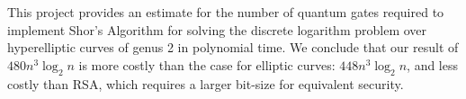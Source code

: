 This project provides an estimate for the number of quantum gates required to implement Shor's Algorithm for solving the discrete logarithm problem over hyperelliptic curves of genus 2 in polynomial time. We conclude that our result of $480n^3\log_2n$ is more costly than the case for elliptic curves: $448n^3\log_2n$, and less costly than RSA, which requires a larger bit-size for equivalent security.
